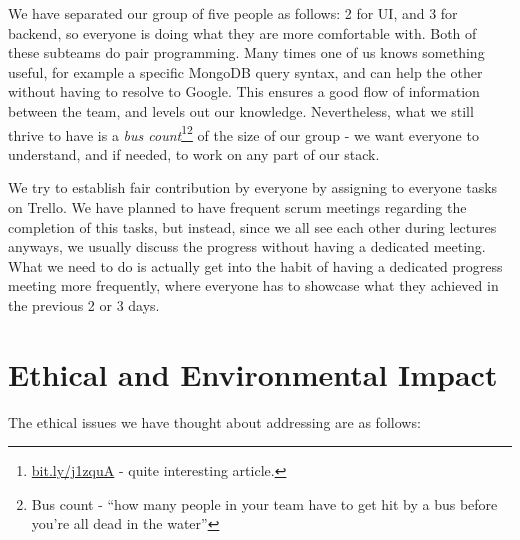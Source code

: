 \documentclass[a4paper,12pt]{article}
\begin{document}
	We have separated our group of five people as follows: 2 for UI, and 3 for backend, so everyone is doing what they are more comfortable with. Both of these subteams do pair programming. Many times one of us knows something useful, for example a specific MongoDB query syntax, and can help the other without having to resolve to Google. This ensures a good flow of information between the team, and levels out our knowledge. Nevertheless, what we still thrive to have is a \emph{bus count}\footnote{\url{bit.ly/j1zquA} - quite interesting article.}\footnote{Bus count - ``how many people in your team have to get hit by a bus before you’re all dead in the water''} of the size of our group - we want everyone to understand, and if needed, to work on any part of our stack.
	
	We try to establish fair contribution by everyone by assigning to everyone tasks on Trello. We have planned to have frequent scrum meetings regarding the completion of this tasks, but instead, since we all see each other during lectures anyways, we usually discuss the progress without having a dedicated meeting. What we need to do is actually get into the habit of having a dedicated progress meeting more frequently, where everyone has to showcase what they achieved in the previous 2 or 3 days.
	
	\section{Ethical and Environmental Impact}	
	
	The ethical issues we have thought about addressing are as follows:
	
\end{document}

